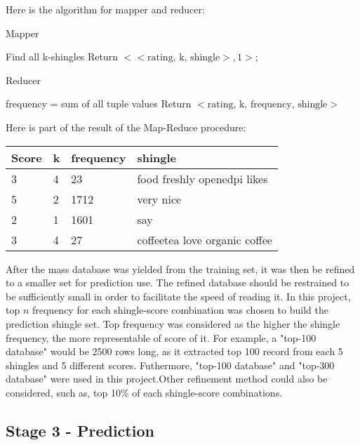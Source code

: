 Here is the algorithm for mapper and reducer:
\begin{algorithm}
\caption{Mapper}
	{
		{
			\label{forins}
			Find all k-shingles\;
			{
				Return \(<<\mbox{rating, k, shingle}>, 1>\);
			}
 		}
	}
\end{algorithm}
\begin{algorithm}
\caption{Reducer}
	 {
		frequency = sum of all tuple values\;
		Return \(<\mbox{rating, k, frequency, shingle}>\)\;
	}
\end{algorithm}

Here is part of the result of the Map-Reduce procedure:
\begin{table}[H]
\begin{tabular}{llll}
  \toprule
	Score& k& frequency& shingle\\
  \midrule
	3&4&23&food freshly openedpi likes\\
	5&2&1712&very nice\\
	2&1&1601&say\\
	3&4&27&coffeetea love organic coffee\\

  \bottomrule

\end{tabular}

\end{table}


After the mass database was yielded from the training set, it was then be refined to a smaller set for prediction use. The refined database should be restrained to be sufficiently small in order to facilitate the speed of reading it. In this project, top \(n\) frequency for each shingle-score combination was chosen to build the prediction shingle set. Top frequency was considered as the higher the shingle frequency, the more representable of score of it. For example, a "top-100 database" would be 2500 rows long, as it extracted top 100 record from each 5 shingles and 5 different scores. Futhermore, "top-100 database" and "top-300 database" were used in this project.Other refinement method could also be considered, such as, top 10\% of each shingle-score combinations.

\subsection{Stage 3 - Prediction}

